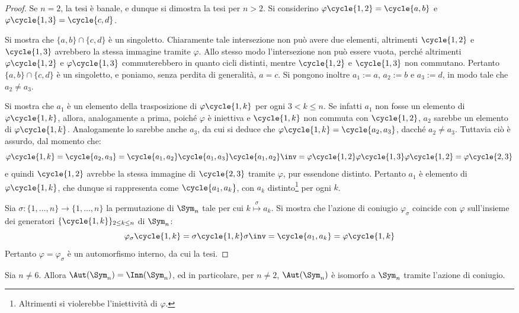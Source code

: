 \documentclass[11pt]{scrartcl}
\begin{document}
	\begin{proof}
		Se $n = 2$, la tesi è banale, e dunque si dimostra la tesi per $n > 2$.
		Si considerino $\varphi\cycle{1, 2} = \cycle{a, b}$ e $\varphi\cycle{1, 3} = \cycle{c, d}$.  \medskip
		

		Si mostra che $\{a, b\} \cap \{c, d\}$ è un singoletto. Chiaramente tale intersezione non può avere
		due elementi, altrimenti $\cycle{1, 2}$ e $\cycle{1, 3}$ avrebbero la stessa immagine tramite
		$\varphi$. Allo stesso modo l'intersezione non può essere vuota, perché altrimenti
		$\varphi\cycle{1, 2}$ e $\varphi\cycle{1, 3}$ commuterebbero in quanto cicli distinti, mentre
		$\cycle{1, 2}$ e $\cycle{1, 3}$ non commutano. Pertanto $\{a, b\} \cap \{c, d\}$ è un singoletto,
		e poniamo, senza perdita di generalità, $a = c$. Si pongono inoltre $a_1 := a$, $a_2 := b$ e
		$a_3 := d$, in modo tale che $a_2 \neq a_3$. \medskip
		
		
		Si mostra che $a_1$ è un elemento della trasposizione di $\varphi\cycle{1, k}$ per ogni $3 < k \leq n$.
		Se infatti $a_1$ non fosse un elemento di $\varphi\cycle{1, k}$, allora, analogamente a prima,
		poiché $\varphi$ è iniettiva e $\cycle{1, k}$ non commuta con $\cycle{1, 2}$, $a_2$ sarebbe un elemento
		di $\varphi\cycle{1, k}$. Analogamente lo sarebbe anche $a_3$, da cui si deduce che $\varphi\cycle{1, k} = \cycle{a_2, a_3}$, dacché $a_2 \neq a_3$. Tuttavia ciò è assurdo, dal momento che:
		\[ \varphi\cycle{1, k} = \cycle{a_2, a_3} = \cycle{a_1, a_2} \cycle{a_1, a_3} \cycle{a_1, a_2}\inv =
		\varphi\cycle{1, 2}\varphi\cycle{1, 3}\varphi\cycle{1, 2} = \varphi\cycle{2, 3} \]
		e quindi $\cycle{1, 2}$ avrebbe la stessa immagine di $\cycle{2, 3}$ tramite $\varphi$, pur
		essendone distinto. Pertanto $a_1$ è elemento di $\varphi\cycle{1, k}$, che dunque si rappresenta
		come $\cycle{a_1, a_k}$, con $a_k$ distinto\footnote{
			Altrimenti si violerebbe l'iniettività di $\varphi$.
		} per ogni $k$. \medskip
		
		
		Sia $\sigma : \{1, \ldots, n\} \to \{1, \ldots, n\}$ la permutazione di $\Sym_n$ tale per cui
		$k \overset{\sigma}{\mapsto} a_k$. Si mostra che l'azione di coniugio $\varphi_\sigma$ coincide
		con $\varphi$ sull'insieme dei generatori $\{\cycle{1, k}\}_{2 \leq k \leq n}$ di
		$\Sym_n$:
		\[ \varphi_\sigma\cycle{1, k} = \sigma \cycle{1, k} \sigma\inv = \cycle{a_1, a_k} = \varphi\cycle{1, k}  \]
		Pertanto $\varphi = \varphi_\sigma$ è un automorfismo interno, da cui la tesi.
	\end{proof}
	
	\begin{theorem}
		\label{th:aut_sn}
		Sia $n \neq 6$. Allora $\Aut(\Sym_n) = \Inn(\Sym_n)$, ed in particolare, per
		$n \neq 2$, $\Aut(\Sym_n)$ è isomorfo a $\Sym_n$ tramite l'azione di coniugio.
	\end{theorem}
	
\end{document}
